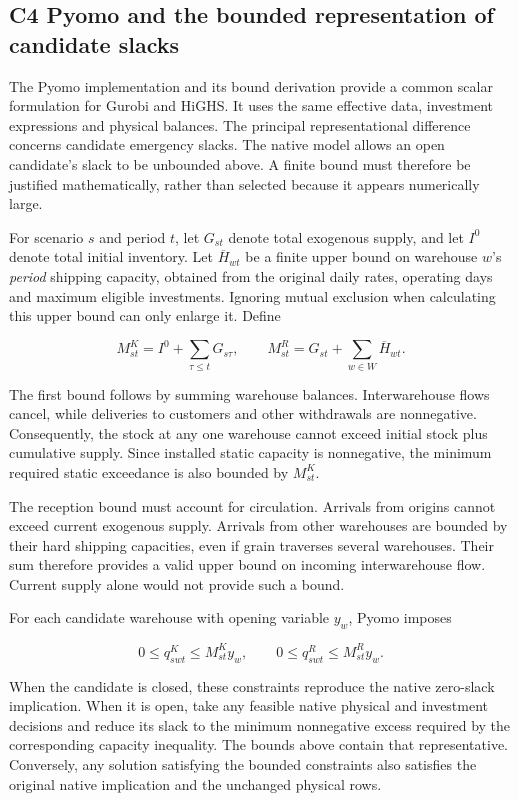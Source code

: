 \documentclass[
  english,
  11pt,
  a4paper,
]{article}
\begin{document}
\subsection{C4 Pyomo and the bounded representation of candidate
slacks}\label{c4-pyomo-and-the-bounded-representation-of-candidate-slacks}

The Pyomo implementation and its bound derivation provide a common
scalar formulation for Gurobi and HiGHS. It uses the same effective
data, investment expressions and physical balances. The principal
representational difference concerns candidate emergency slacks. The
native model allows an open candidate's slack to be unbounded above. A
finite bound must therefore be justified mathematically, rather than
selected because it appears numerically large.

For scenario \(s\) and period \(t\), let \(G_{st}\) denote total
exogenous supply, and let \(I^0\) denote total initial inventory. Let
\(\overline H_{wt}\) be a finite upper bound on warehouse \(w\)'s
\emph{period} shipping capacity, obtained from the original daily rates,
operating days and maximum eligible investments. Ignoring mutual
exclusion when calculating this upper bound can only enlarge it. Define

\[
M^K_{st}=I^0+\sum_{\tau\leq t}G_{s\tau},
\qquad
M^R_{st}=G_{st}+\sum_{w\in W}\overline H_{wt}.
\tag{C.2}
\]

The first bound follows by summing warehouse balances. Interwarehouse
flows cancel, while deliveries to customers and other withdrawals are
nonnegative. Consequently, the stock at any one warehouse cannot exceed
initial stock plus cumulative supply. Since installed static capacity is
nonnegative, the minimum required static exceedance is also bounded by
\(M^K_{st}\).

The reception bound must account for circulation. Arrivals from origins
cannot exceed current exogenous supply. Arrivals from other warehouses
are bounded by their hard shipping capacities, even if grain traverses
several warehouses. Their sum therefore provides a valid upper bound on
incoming interwarehouse flow. Current supply alone would not provide
such a bound.

For each candidate warehouse with opening variable \(y_w\), Pyomo
imposes

\[
0\leq q^K_{swt}\leq M^K_{st}y_w,
\qquad
0\leq q^R_{swt}\leq M^R_{st}y_w.
\tag{C.3}
\]

When the candidate is closed, these constraints reproduce the native
zero-slack implication. When it is open, take any feasible native
physical and investment decisions and reduce its slack to the minimum
nonnegative excess required by the corresponding capacity inequality.
The bounds above contain that representative. Conversely, any solution
satisfying the bounded constraints also satisfies the original native
implication and the unchanged physical rows.
\end{document}
